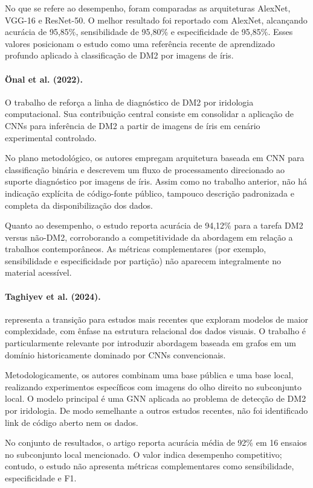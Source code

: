 \documentclass[11pt,a4paper]{article}
\begin{document}
No que se refere ao desempenho, foram comparadas as arquiteturas AlexNet, VGG-16 e ResNet-50. O melhor resultado foi reportado com AlexNet, alcançando acurácia de 95,85\%, sensibilidade de 95,80\% e especificidade de 95,85\%. Esses valores posicionam o estudo como uma referência recente de aprendizado profundo aplicado à classificação de DM2 por imagens de íris.

\paragraph{{\"O}nal et al. (2022).}
O trabalho de \citet{OnalEtAl2022MTA} reforça a linha de diagnóstico de DM2 por iridologia computacional. Sua contribuição central consiste em consolidar a aplicação de CNNs para inferência de DM2 a partir de imagens de íris em cenário experimental controlado.

No plano metodológico, os autores empregam arquitetura baseada em CNN para classificação binária e descrevem um fluxo de processamento direcionado ao suporte diagnóstico por imagens de íris. Assim como no trabalho anterior, não há indicação explícita de código-fonte público, tampouco descrição padronizada e completa da disponibilização dos dados.

Quanto ao desempenho, o estudo reporta acurácia de 94,12\% para a tarefa DM2 versus não-DM2, corroborando a competitividade da abordagem em relação a trabalhos contemporâneos. As métricas complementares (por exemplo, sensibilidade e especificidade por partição) não aparecem integralmente no material acessível.

\paragraph{Taghiyev et al. (2024).}
\citet{TaghiyevEtAl2024AICT} representa a transição para estudos mais recentes que exploram modelos de maior complexidade, com ênfase na estrutura relacional dos dados visuais. O trabalho é particularmente relevante por introduzir abordagem baseada em grafos em um domínio historicamente dominado por CNNs convencionais.

Metodologicamente, os autores combinam uma base pública e uma base local, realizando experimentos específicos com imagens do olho direito no subconjunto local. O modelo principal é uma GNN aplicada ao problema de detecção de DM2 por iridologia. De modo semelhante a outros estudos recentes, não foi identificado link de código aberto nem os dados.

No conjunto de resultados, o artigo reporta acurácia média de 92\% em 16 ensaios no subconjunto local mencionado. O valor indica desempenho competitivo; contudo, o estudo não apresenta métricas complementares como sensibilidade, especificidade e F1.
\end{document}
